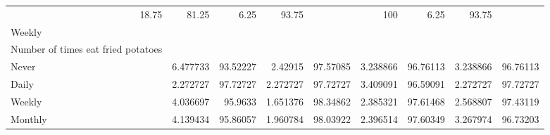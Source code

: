 \documentclass{article}
\begin{document}
\begin{table}[!h]
{\begin{tabular}{lllllllll}
				\multicolumn{1}{|r}{18.75} &
				\multicolumn{1}{r}{81.25} &
				\multicolumn{1}{r}{6.25} &
				\multicolumn{1}{r}{93.75} &
				\multicolumn{1}{r}{} &
				\multicolumn{1}{r}{100} &
				\multicolumn{1}{r}{6.25} &
				\multicolumn{1}{r}{93.75} \\
				\multicolumn{1}{l}{\hspace{3em}Weekly} &
				\multicolumn{1}{|r}{} &
				\multicolumn{1}{r}{} &
				\multicolumn{1}{r}{} &
				\multicolumn{1}{r}{} &
				\multicolumn{1}{r}{} &
				\multicolumn{1}{r}{} &
				\multicolumn{1}{r}{} &
				\multicolumn{1}{r}{} \\
				\multicolumn{1}{l}{\hspace{4em}Number of times eat fried potatoes} &
				\multicolumn{1}{|r}{} &
				\multicolumn{1}{r}{} &
				\multicolumn{1}{r}{} &
				\multicolumn{1}{r}{} &
				\multicolumn{1}{r}{} &
				\multicolumn{1}{r}{} &
				\multicolumn{1}{r}{} &
				\multicolumn{1}{r}{} \\
				\multicolumn{1}{l}{\hspace{5em}Never} &
				\multicolumn{1}{|r}{6.477733} &
				\multicolumn{1}{r}{93.52227} &
				\multicolumn{1}{r}{2.42915} &
				\multicolumn{1}{r}{97.57085} &
				\multicolumn{1}{r}{3.238866} &
				\multicolumn{1}{r}{96.76113} &
				\multicolumn{1}{r}{3.238866} &
				\multicolumn{1}{r}{96.76113} \\
				\multicolumn{1}{l}{\hspace{5em}Daily} &
				\multicolumn{1}{|r}{2.272727} &
				\multicolumn{1}{r}{97.72727} &
				\multicolumn{1}{r}{2.272727} &
				\multicolumn{1}{r}{97.72727} &
				\multicolumn{1}{r}{3.409091} &
				\multicolumn{1}{r}{96.59091} &
				\multicolumn{1}{r}{2.272727} &
				\multicolumn{1}{r}{97.72727} \\
				\multicolumn{1}{l}{\hspace{5em}Weekly} &
				\multicolumn{1}{|r}{4.036697} &
				\multicolumn{1}{r}{95.9633} &
				\multicolumn{1}{r}{1.651376} &
				\multicolumn{1}{r}{98.34862} &
				\multicolumn{1}{r}{2.385321} &
				\multicolumn{1}{r}{97.61468} &
				\multicolumn{1}{r}{2.568807} &
				\multicolumn{1}{r}{97.43119} \\
				\multicolumn{1}{l}{\hspace{5em}Monthly} &
				\multicolumn{1}{|r}{4.139434} &
				\multicolumn{1}{r}{95.86057} &
				\multicolumn{1}{r}{1.960784} &
				\multicolumn{1}{r}{98.03922} &
				\multicolumn{1}{r}{2.396514} &
				\multicolumn{1}{r}{97.60349} &
				\multicolumn{1}{r}{3.267974} &
				\multicolumn{1}{r}{96.73203} \\

\end{tabular}}
\end{table}
\end{document}
